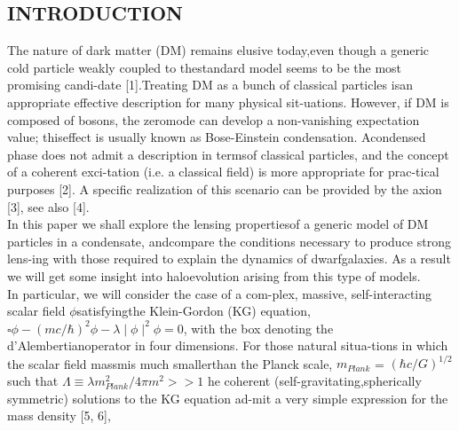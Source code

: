 \documentclass[10pt,a4paper]{article}
\begin{document}
\begin{multicols}{2}
\begin{center}
\section{INTRODUCTION}
\end{center}
\setlength{\parindent}{4ex}
\indent
The nature of dark matter (DM) remains elusive today,even though a generic cold particle weakly coupled to thestandard model seems to be the most promising candi-date [1].Treating DM as a bunch of classical particles isan appropriate effective description for many physical sit-uations.  However, if DM is composed of bosons, the zeromode can develop a non-vanishing expectation value; thiseffect is usually known as Bose-Einstein condensation.  Acondensed phase does not admit a description in termsof classical particles, and the concept of a coherent exci-tation (i.e.  a classical field) is more appropriate for prac-tical purposes [2].  A specific realization of this scenario can be provided by the axion [3], see also [4].\\
\indent 
In  this  paper  we  shall  explore  the  lensing  propertiesof a generic model of DM particles in a condensate, andcompare the conditions necessary to produce strong lens-ing with those required to explain the dynamics of dwarfgalaxies.  As a result we will get some insight into haloevolution arising from this type of models.\\
\indent 
In  particular,  we  will  consider  the  case  of  a  com-plex,  massive,  self-interacting  scalar  field  \(\phi\)satisfyingthe  Klein-Gordon  (KG)  equation, \(\square\phi - (mc /\hbar)^{2}\phi - \lambda\mid\phi\mid^{2}\phi = 0\), with  the  box  denoting  the  d’Alembertianoperator  in  four  dimensions.   For  those  natural  situa-tions  in  which  the  scalar  field  massmis  much  smallerthan  the  Planck  scale, \(m_{Plank}\) = \((\hbar c/G)^{1/2}\) such  that \(\Lambda \equiv \lambda m^{2}_{Plank} / 4\pi m^{2} >> 1\) he coherent (self-gravitating,spherically symmetric) solutions to the KG equation ad-mit a very simple expression for the mass density  [5, 6],\\


\end{multicols}
\end{document}
